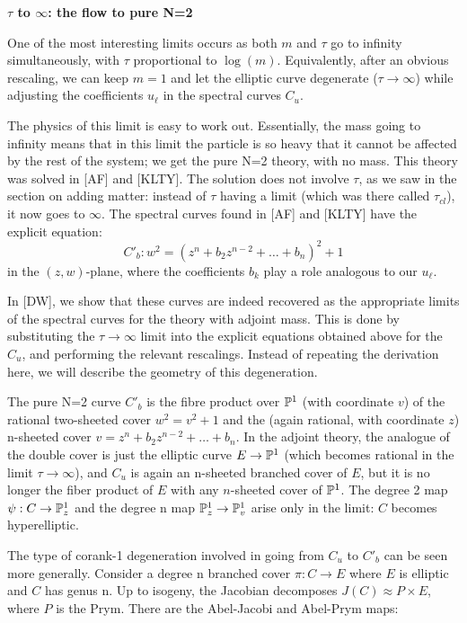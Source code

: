 \medskip\noindent
{\bf $\tau$ to $\infty$: the flow to pure N=2}

One of the most interesting limits occurs as both $m$ and $\tau$ go to
infinity simultaneously, with $\tau$ proportional to $\log(m)$.
Equivalently, after an obvious rescaling, we can keep $m=1$ and let the
elliptic curve degenerate ($\tau \to \infty$) while adjusting the
coefficients $u_{\ell}$ in the spectral curves $C_u$.

The physics of this limit is easy to work out. Essentially, the mass
going to infinity means that in this limit the particle is so heavy
that it cannot be affected by the rest of the system; we get the pure
N=2 theory, with no mass. This theory was solved in [AF] and [KLTY].
The solution does not involve $\tau$, as we saw in the section on
adding matter: instead of $\tau$ having a limit (which was there called
$\tau_{cl}$), it now goes to $\infty$. The spectral curves found in [AF]
and [KLTY] have the explicit equation:  
$$ C'_b: w^2 = (z^n + b_2 z^{n-2} + \dots + b_n )^2 + 1 $$ 
in the $(z,w)$-plane, where the
coefficients $b_k$ play a role analogous to our $u_{\ell}$.

In [DW], we show that these curves are indeed recovered as the
appropriate limits of the spectral curves for the theory with adjoint
mass. This is done by substituting the $\tau \to \infty$ limit into the
explicit equations obtained above for the $C_u$, and performing the
relevant rescalings. Instead of repeating the derivation here, we will
describe the geometry of this degeneration.

The pure N=2 curve $C'_b$ is the fibre product over ${\Bbb P}^1$ (with
coordinate $v$) of the rational two-sheeted cover $w^2 = v^2 +1$ and
the (again rational, with coordinate $z$) n-sheeted cover $v=z^n + b_2
z^{n-2} + \dots + b_n$. In the adjoint theory, the analogue of the
double cover is just the elliptic curve $E \to {\Bbb P}^1$ (which becomes
rational in the limit $\tau \to \infty$), and $C_u$ is again an
n-sheeted branched cover of $E$, but it is no longer the fiber product
of $E$ with any $n$-sheeted cover of ${\Bbb P}^1$. The degree 2 map $\psi:
C \to {\Bbb P}^1_z$ and the degree n map ${\Bbb P}^1_z \to {\Bbb P}^1_v$ arise only
in the limit: $C$ becomes hyperelliptic.

The type of corank-1 degeneration involved in going from $C_u$ to
$C'_b$ can be seen more generally. Consider a degree n branched cover
$\pi : C \to E$ where $E$ is elliptic and $C$ has genus n. Up to
isogeny, the Jacobian decomposes $J(C) \approx P \times E$, where $P$
is the Prym. There are the Abel-Jacobi and Abel-Prym maps:

